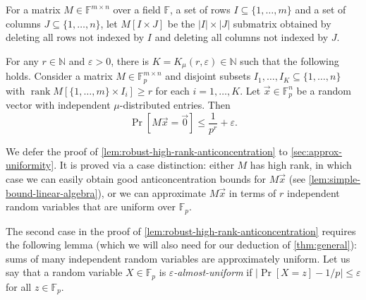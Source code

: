 \documentclass[10pt,reqno]{amsart}
\numberwithin{equation}{section}
\theoremstyle{remark}
\newcommand{\mb}{\mathbb}
\newcommand{\on}{\operatorname}
\begin{document}
\begin{definition}\label{def:matrix-indexing}
    For a matrix $M\in \mb F^{m\times n}$ over a field $\mb F$, a set of rows $I\subseteq \{1,\dots,m\}$ and a set of columns $J\subseteq \{1,\dots,n\}$, let $M[I\times J]$ be the $|I|\times |J|$ submatrix obtained by deleting all rows not indexed by $I$ and deleting all columns not indexed by $J$.
\end{definition}

\begin{lemma}\label{lem:robust-high-rank-anticoncentration}
For any $r\in \mb N$ and $\varepsilon>0$, there is $K=K_\mu(r,\varepsilon)\in \mb N$ such that the following holds. Consider a matrix $M\in \mb F_p^{m\times n}$ and disjoint subsets $I_1,\dots,I_{K}\subseteq\{1,\dots,n\}$ with $\on{rank} M[\{1,\dots,m\}\times I_i]\ge r$ for each $i=1,\dots,K$. Let $\vec x\in \mb F_p^n$ be a random vector 
with independent $\mu$-distributed entries. Then
\[\Pr[ M\vec{x}=\vec 0]\le \frac 1{p^r}+\varepsilon.\]
\end{lemma}
We defer the proof of \cref{lem:robust-high-rank-anticoncentration} to \cref{sec:approx-uniformity}. It is proved via a case distinction: either $M$ has high rank, in which case we can easily obtain good anticoncentration bounds for $M\vec x$ (see \cref{lem:simple-bound-linear-algebra}), or we can approximate $M\vec x$ in terms of $r$ independent random variables that are uniform over $\mb F_p$.

The second case in the proof of \cref{lem:robust-high-rank-anticoncentration} requires the following lemma (which we will also need for our deduction of \cref{thm:general}): sums of many independent random variables are approximately uniform. Let us say that a random variable $X\in \mb F_p$ is \emph{$\varepsilon$-almost-uniform} if $\big|\!\Pr[X=z]-1/p\big|\le \varepsilon$ for all $z\in \mb F_p$.
\end{document}
